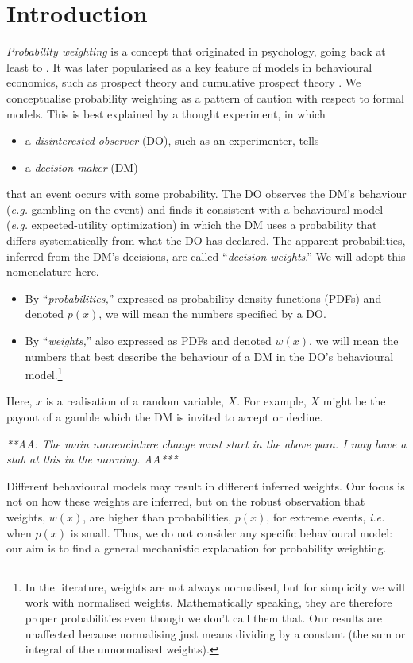 \documentclass[a4paper, 12pt]{article}
\newcommand{\bi}{\begin{itemize}}
\newcommand{\ei}{\end{itemize}}
\newcommand{\ie}{\textit{i.e.}\xspace}
\newcommand{\eg}{\textit{e.g.}\xspace}
\renewcommand{\AA}[1]{{\it ***AA: #1 AA***}}
\begin{document}
\section{Introduction}
\textit{Probability weighting} is a concept that originated in psychology, going back at least to \textcite{PrestonBaratta1948}.
It was later popularised as a key feature of models in behavioural economics, such as prospect theory \parencite{KahnemanTversky1979} and cumulative prospect theory \parencite{TverskyKahneman1992}.
We conceptualise probability weighting as a pattern of caution with respect to formal models.
This is best explained by a thought experiment, in which  
\bi
	\item a \textit{disinterested observer} (DO), such as an experimenter, tells
	\item a \textit{decision maker} (DM)
\ei
that an event occurs with some probability. The DO observes the DM's behaviour (\eg gambling on the event) and finds it consistent with a behavioural model (\eg expected-utility optimization) in which the DM uses a probability that differs systematically from what the DO has declared. The apparent probabilities, inferred from the DM's decisions, are called ``\textit{decision weights}.'' We will adopt this nomenclature here.
% 
\bi
	\item By ``\textit{probabilities,}'' expressed as probability density functions (PDFs) and denoted $p(x)$, we will mean the numbers specified by a DO.
	\item By ``\textit{weights,}'' also expressed as PDFs and denoted $w(x)$, we will mean the numbers that best describe the behaviour of a DM in the DO's behavioural model.\footnote{In the literature, weights are not always normalised, but for simplicity we will work with normalised weights. Mathematically speaking, they are therefore proper probabilities even though we don't call them that. Our results are unaffected because normalising just means dividing by a constant (the sum or integral of the unnormalised weights).}
\ei
Here, $x$ is a realisation of a random variable, $X$. For example, $X$ might be the payout of a gamble which the DM is invited to accept or decline.

\AA{The main nomenclature change must start in the above para. I may have a stab at this in the morning.}

Different behavioural models may result in different inferred weights. Our focus is not on how these weights are inferred, but on the robust observation that weights, $w(x)$, are higher than probabilities, $p(x)$, for extreme events, \ie when $p(x)$ is small. Thus, we do not consider any specific behavioural model: our aim is to find a general mechanistic explanation for probability weighting.
\end{document}
